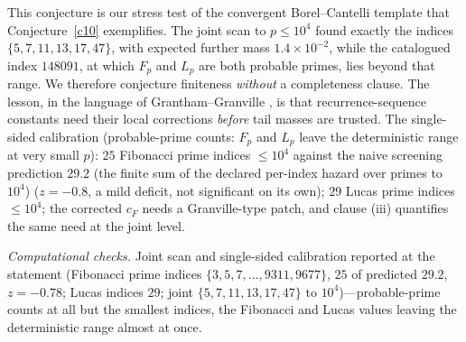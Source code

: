 \documentclass[11pt]{article}
\theoremstyle{definition}
\begin{document}
This conjecture is our stress test of the convergent
Borel--Cantelli template that Conjecture~\ref{c10} exemplifies.  The
joint scan to $p\le10^4$ found exactly the indices
$\{5,7,11,13,17,47\}$, with expected further mass $1.4\times10^{-2}$,
while the catalogued index $148091$, at which $F_p$ and $L_p$ are
both probable primes, lies beyond that range.  We
therefore conjecture finiteness \emph{without} a completeness clause.
The lesson, in the language of
Grantham--Granville
\cite{GranthamGranville}, is that recurrence-sequence constants need
their local corrections \emph{before} tail masses are trusted.  The
single-sided calibration (probable-prime counts: $F_p$ and $L_p$
leave the deterministic range at very small $p$): $25$ Fibonacci
prime indices
$\le10^4$ against the naive screening prediction $29.2$ (the finite sum of the declared per-index hazard over primes to $10^4$)
($z=-0.8$, a mild deficit, not significant on its own); $29$ Lucas
prime indices $\le10^4$; the corrected $c_F$ needs a Granville-type patch,
and clause (iii) quantifies the same need at the joint level.

\emph{Computational checks.}  Joint scan and single-sided calibration reported at the
statement (Fibonacci prime indices $\{3,5,7,\dots,9311,9677\}$, $25$
of predicted $29.2$, $z=-0.78$; Lucas indices $29$; joint
$\{5,7,11,13,17,47\}$ to $10^4$)---probable-prime counts at all but
the smallest indices, the Fibonacci and Lucas values leaving the
deterministic range almost at once.
\end{document}
